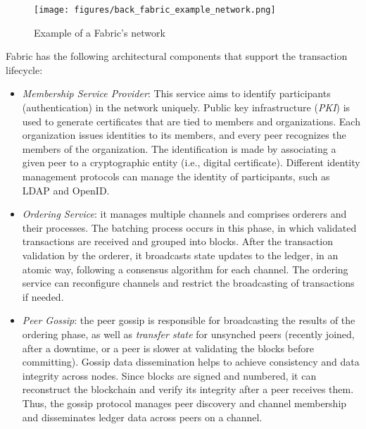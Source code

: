 \documentclass[12pt,a4paper]{article}
\theoremstyle{definition}
\begin{document}
\begin{figure}[ht]

\texttt{[image: figures/back\_fabric\_example\_network.png]}
\centering
\caption{Example of a Fabric's network}
\label{fig: Fabric's example network}
\end{figure}

Fabric has the following architectural components that support the transaction lifecycle:
\begin{itemize}
\item \emph{Membership Service Provider}: This service aims to identify participants (authentication) in the network uniquely. Public key infrastructure (\textit{PKI}) is used to generate certificates that are tied to members and organizations. Each organization issues identities to its members, and every peer recognizes the members of the organization. The identification is made by associating a given peer to a cryptographic entity (i.e., digital certificate). Different identity management protocols can manage the identity of participants, such as LDAP and OpenID.
\item \emph{Ordering Service}: it manages multiple channels and comprises orderers and their processes. The batching process occurs in this phase, in which validated transactions are received and grouped into blocks. After the transaction validation by the orderer, it broadcasts state updates to the ledger, in an atomic way, following a consensus algorithm for each channel. The ordering service can reconfigure channels and restrict the broadcasting of transactions if needed.
\item \emph{Peer Gossip}: the peer gossip is responsible for broadcasting the results of the ordering phase, as well as \textit{transfer state} for unsynched peers (recently joined, after a downtime, or a peer is slower at validating the blocks before committing). Gossip data dissemination helps to achieve consistency and data integrity across nodes. Since blocks are signed and numbered, it can reconstruct the blockchain and verify its integrity after a peer receives them. Thus, the gossip protocol manages peer discovery and channel membership and disseminates ledger data across peers on a channel.

\end{itemize}
\end{document}
